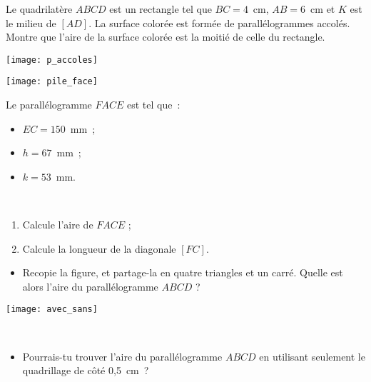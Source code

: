 \begin{exercice}
Le quadrilatère $ABCD$ est un rectangle tel que $BC = 4$ cm, $AB = 6$ cm et $K$ est le milieu de $[AD]$. La surface colorée est formée de parallélogrammes accolés. Montre que l'aire de la surface colorée est la moitié de celle du rectangle.
 \begin{center} \texttt{[image: p\_accoles]} \end{center} 
\end{exercice}


\begin{exercice}
\begin{minipage}[c]{0.38\linewidth}
\texttt{[image: pile\_face]}
 \end{minipage} \hfill%
 \begin{minipage}[c]{0.58\linewidth}
Le parallélogramme $FACE$ est tel que :
 \begin{itemize}
  \item $EC = 150$ mm ;
  \item $h = 67$ mm ;
  \item $k = 53$ mm.
  \end{itemize}
  \end{minipage} \\
  \begin{enumerate}
   \item Calcule l'aire de $FACE$ ;
   \item Calcule la longueur de la diagonale $[FC]$.
   \end{enumerate}
\end{exercice}


\begin{exercice}
\begin{minipage}[c]{0.48\linewidth}
\begin{itemize}
 \item Recopie la figure, et partage-la en quatre triangles et un carré. Quelle est alors l'aire du parallélogramme $ABCD$ ?
 \end{itemize}
 \end{minipage} \hfill%
 \begin{minipage}[c]{0.48\linewidth}
\begin{center} \texttt{[image: avec\_sans]} \end{center} 
  \end{minipage} \\
  \begin{itemize}
   \item Pourrais-tu trouver l'aire du parallélogramme $ABCD$ en utilisant seulement le quadrillage de côté 0,5 cm ? 
   \end{itemize}
\end{exercice}


